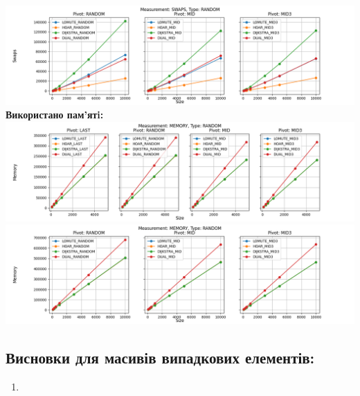 \documentclass{article}
\begin{document}
        \includegraphics[scale=0.5]{random_Swaps_3_pivots_7_numbers.png}
        \newline
    \newpage
    \textbf{Використано пам’ятi:}
    \newline
        \includegraphics[scale=0.5]{random_Memory_6_numbers.png}
        \includegraphics[scale=0.5]{random_Memory_3_pivots_7_numbers.png}
    \subsection{Висновки для масивів випадкових елементів:}
    \begin{enumerate}
        \item 
    \end{enumerate}
    \newpage

\end{document}
